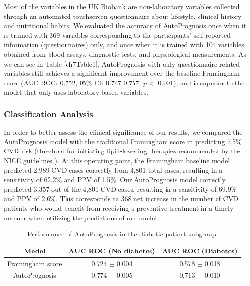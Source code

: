 \documentclass [PhD] {uclathes}
\begin{document}
Most of the variables in the UK Biobank are non-laboratory variables collected through an automated touchscreen questionnaire about lifestyle, clinical history and nutritional habits. We evaluated the accuracy of AutoPrognosis once when it is trained with 369 variables corresponding to the participants' self-reported information (questionnaires) only, and once when it is trained with 104 variables obtained from blood assays, diagnostic tests, and physiological measurements. As we can see in Table \ref{ch7Table1}, AutoPrognosis with only questionnaire-related variables still achieves a significant improvement over the baseline Framingham score (AUC-ROC: 0.752, 95$\%$ CI: 0.747-0.757, $p <$ 0.001), and is superior to the model that only uses laboratory-based variables. 

\subsubsection*{Classification Analysis} 
In order to better assess the clinical significance of our results, we compared the AutoPrognosis model with the traditional Framingham score in predicting 7.5$\%$ CVD risk (threshold for initiating lipid-lowering therapies recommended by the NICE guidelines \cite{hippisley2017development}). At this operating point, the Framingham baseline model predicted 2,989 CVD cases correctly from 4,801 total cases, resulting in a sensitivity of 62.2$\%$ and PPV of 1.5$\%$. Our AutoPrognosis model correctly predicted 3,357 out of the 4,801 CVD cases, resulting in a sensitivity of 69.9$\%$ and PPV of 2.6$\%$. This corresponds to 368 net increase in the number of CVD patients who would benefit from receiving a preventive treatment in a timely manner when utilizing the predictions of our model.

\begin{table}[t]
\centering
\begin{tabular}{|c|c|c|}
\hline
{\bf \footnotesize Model} & {\bf \footnotesize AUC-ROC (No diabetes)} & {\bf \footnotesize AUC-ROC (Diabetes)}  \\ \hline
{\footnotesize Framingham score} & {\footnotesize 0.724 $\pm$ 0.004} & {\footnotesize 0.578 $\pm$ 0.018}  \\ \hline \hline
{\footnotesize AutoPrognosis} & {\footnotesize 0.774 $\pm$ 0.005} & {\footnotesize 0.713 $\pm$ 0.010} \\ \hline
\end{tabular}
\caption{Performance of AutoPrognosis in the diabetic patient subgroup.}
\label{ch7Table3}
\end{table}
\end{document}
